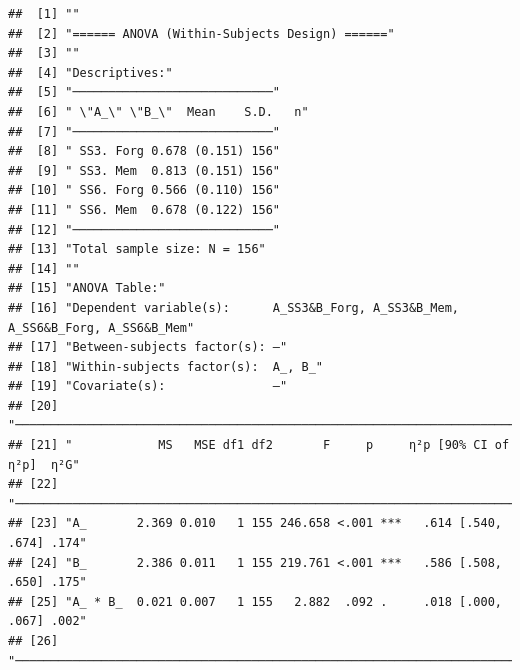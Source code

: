 \documentclass[
  man]{apa6}
\begin{document}
\begin{verbatim}
##  [1] ""                                                                                       
##  [2] "====== ANOVA (Within-Subjects Design) ======"                                           
##  [3] ""                                                                                       
##  [4] "Descriptives:"                                                                          
##  [5] "────────────────────────────"                                                           
##  [6] " \"A_\" \"B_\"  Mean    S.D.   n"                                                       
##  [7] "────────────────────────────"                                                           
##  [8] " SS3. Forg 0.678 (0.151) 156"                                                           
##  [9] " SS3. Mem  0.813 (0.151) 156"                                                           
## [10] " SS6. Forg 0.566 (0.110) 156"                                                           
## [11] " SS6. Mem  0.678 (0.122) 156"                                                           
## [12] "────────────────────────────"                                                           
## [13] "Total sample size: N = 156"                                                             
## [14] ""                                                                                       
## [15] "ANOVA Table:"                                                                           
## [16] "Dependent variable(s):      A_SS3&B_Forg, A_SS3&B_Mem, A_SS6&B_Forg, A_SS6&B_Mem"       
## [17] "Between-subjects factor(s): –"                                                          
## [18] "Within-subjects factor(s):  A_, B_"                                                     
## [19] "Covariate(s):               –"                                                          
## [20] "───────────────────────────────────────────────────────────────────────"                
## [21] "            MS   MSE df1 df2       F     p     η²p [90% CI of η²p]  η²G"                
## [22] "───────────────────────────────────────────────────────────────────────"                
## [23] "A_       2.369 0.010   1 155 246.658 <.001 ***   .614 [.540, .674] .174"                
## [24] "B_       2.386 0.011   1 155 219.761 <.001 ***   .586 [.508, .650] .175"                
## [25] "A_ * B_  0.021 0.007   1 155   2.882  .092 .     .018 [.000, .067] .002"                
## [26] "───────────────────────────────────────────────────────────────────────"                

\end{verbatim}
\end{document}
